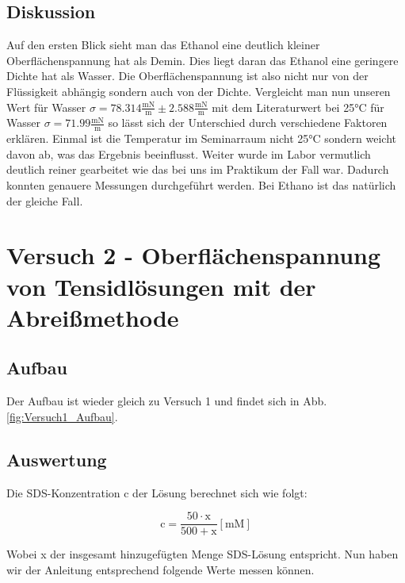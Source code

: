         \subsection{Diskussion}
        
            Auf den ersten Blick sieht man das Ethanol eine deutlich kleiner Oberflächenspannung hat als Demin. Dies liegt daran das Ethanol eine geringere Dichte hat als Wasser. Die Oberflächenspannung ist also nicht nur von der Flüssigkeit abhängig sondern auch von der Dichte. Vergleicht man nun unseren Wert für Wasser $\sigma = 78.314 \frac{\mathrm{mN}}{\mathrm{m}} \pm 2.588 \frac{\mathrm{mN}}{\mathrm{m}}$ mit dem Literaturwert bei 25°C für Wasser $\sigma = 71.99 \frac{\mathrm{mN}}{\mathrm{m}}$ so lässt sich der Unterschied durch verschiedene Faktoren erklären. Einmal ist die Temperatur im Seminarraum nicht 25°C sondern weicht davon ab, was das Ergebnis beeinflusst. Weiter wurde im Labor vermutlich deutlich reiner gearbeitet wie das bei uns im Praktikum der Fall war. Dadurch konnten genauere Messungen durchgeführt werden. Bei Ethano ist das natürlich der gleiche Fall.

    \section{Versuch 2 - Oberflächenspannung von Tensidlösungen mit der Abreißmethode}

        \subsection{Aufbau}
            
            Der Aufbau ist wieder gleich zu Versuch 1 und findet sich in Abb. \ref{fig:Versuch1_Aufbau}.

        \subsection{Auswertung}

            Die SDS-Konzentration $\mathrm{c}$ der Lösung berechnet sich wie folgt:

            \begin{equation}
                \mathrm{c} = \frac{50 \cdot \mathrm{x}}{500  + \mathrm{x} }\mathrm{[mM]}
                \label{eq:Konzentration}
            \end{equation}
            
            Wobei x der insgesamt hinzugefügten Menge SDS-Lösung entspricht. Nun haben wir der Anleitung entsprechend folgende Werte messen können.

